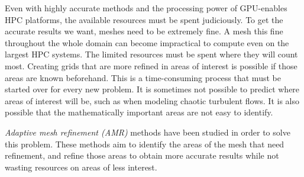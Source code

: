 Even with highly accurate methods and the processing power of GPU-enables HPC platforms, the
available resources must be spent judiciously. To get the accurate results we want, meshes need to
be extremely fine. A mesh this fine throughout the whole domain can become impractical to compute
even on the largest HPC systems. The limited resources must be spent where they will count most.
Creating grids that are more refined in areas of interest is possible if those areas are known
beforehand. This is a time-consuming process that must be started over for every new problem. It is
sometimes not possible to predict where areas of interest will be, such as when modeling chaotic
turbulent flows. It is also possible that the mathematically important areas are not easy to
identify. 

\textit{Adaptive mesh refinement (AMR)} methods have been studied in order to solve this problem.
These methods aim to identify the areas of the mesh that need refinement, and refine those areas to
obtain more accurate results while not wasting resources on areas of less interest.
~\cite{Berger1984}


